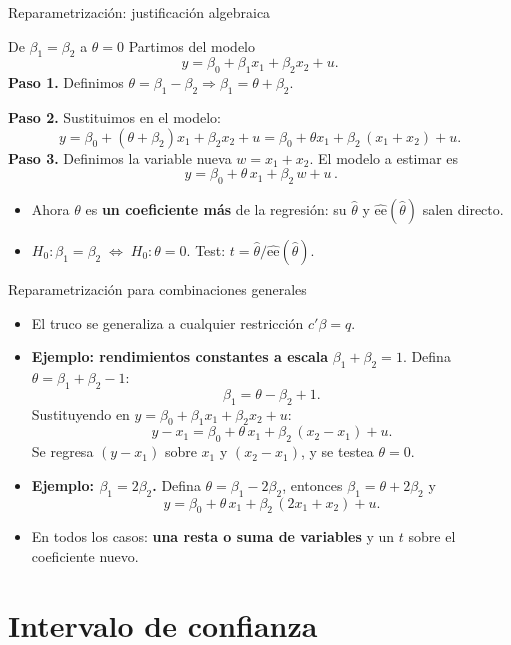 \documentclass{beamer}
\begin{document}
\begin{frame}{Reparametrización: justificación algebraica}
\begin{exampleblock}{De $\beta_1=\beta_2$ a $\theta=0$}
Partimos del modelo
\[
y = \beta_0 + \beta_1 x_1 + \beta_2 x_2 + u.
\]
\textbf{Paso 1.} Definimos $\theta=\beta_1-\beta_2 \Rightarrow \beta_1=\theta+\beta_2$.

\textbf{Paso 2.} Sustituimos en el modelo:
\[
y = \beta_0 + (\theta+\beta_2)x_1 + \beta_2 x_2 + u = \beta_0 + \theta x_1 + \beta_2\,(x_1+x_2) + u.
\]
\textbf{Paso 3.} Definimos la variable nueva $w = x_1+x_2$. El modelo a estimar es
\[
\boxed{\,y = \beta_0 + \theta\,x_1 + \beta_2\,w + u\,}.
\]
\end{exampleblock}
\pause
\begin{itemize}
    \item Ahora $\theta$ es \textbf{un coeficiente más} de la regresión: su $\hat{\theta}$ y $\widehat{\text{ee}}(\hat{\theta})$ salen directo.
    \item $H_0:\beta_1=\beta_2 \;\Leftrightarrow\; H_0:\theta=0$. Test: $t=\hat{\theta}/\widehat{\text{ee}}(\hat{\theta})$.
\end{itemize}
\end{frame}

\begin{frame}{Reparametrización para combinaciones generales}
\begin{itemize}
    \item El truco se generaliza a cualquier restricción $c'\beta=q$.
    \item \textbf{Ejemplo: rendimientos constantes a escala} $\beta_1+\beta_2=1$. Defina $\theta=\beta_1+\beta_2-1$:
    \[
    \beta_1 = \theta - \beta_2 + 1.
    \]
    Sustituyendo en $y=\beta_0+\beta_1 x_1+\beta_2 x_2+u$:
    \[
    y - x_1 = \beta_0 + \theta\, x_1 + \beta_2\,(x_2 - x_1) + u.
    \]
    Se regresa $(y-x_1)$ sobre $x_1$ y $(x_2-x_1)$, y se testea $\theta=0$.
    \pause
    \item \textbf{Ejemplo: $\beta_1=2\beta_2$.} Defina $\theta=\beta_1-2\beta_2$, entonces $\beta_1=\theta+2\beta_2$ y
    \[
    y = \beta_0 + \theta\,x_1 + \beta_2\,(2x_1+x_2) + u.
    \]
    \item En todos los casos: \textbf{una resta o suma de variables} y un $t$ sobre el coeficiente nuevo.
\end{itemize}
\end{frame}

\section{Intervalo de confianza}
\end{document}
